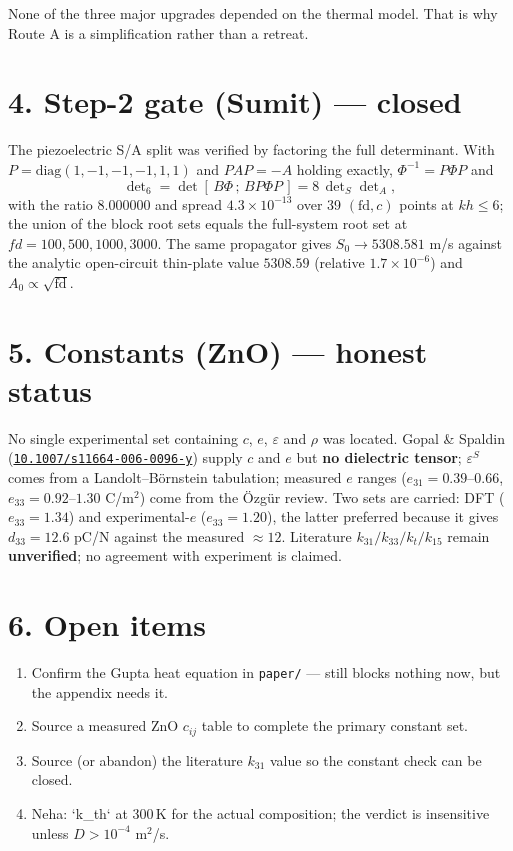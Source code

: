 \documentclass[11pt]{article}
\newcommand{\doi}[1]{\href{https://doi.org/#1}{\texttt{#1}}}
\begin{document}
\noindent None of the three major upgrades depended on the thermal model. That is why Route A is a
simplification rather than a retreat.

\section*{4. Step-2 gate (Sumit) --- closed}

The piezoelectric S/A split was verified by factoring the full determinant. With
$P=\mathrm{diag}(1,-1,-1,-1,1,1)$ and $PAP=-A$ holding exactly, $\Phi^{-1}=P\Phi P$ and
\[
\det\nolimits_{6}=\det[\,B\Phi\,;\,B P\Phi P\,]=8\,\det\nolimits_{S}\det\nolimits_{A},
\]
with the ratio $8.000000$ and spread $4.3\times10^{-13}$ over 39 $(\mathrm{fd},c)$ points at $kh\le6$;
the union of the block root sets equals the full-system root set at $fd=100,500,1000,3000$. The same
propagator gives $S_0\to5308.581$ m/s against the analytic open-circuit thin-plate value $5308.59$
(relative $1.7\times10^{-6}$) and $A_0\propto\sqrt{\mathrm{fd}}$.

\section*{5. Constants (ZnO) --- honest status}

No single experimental set containing $c$, $e$, $\varepsilon$ and $\rho$ was located. Gopal \& Spaldin
(\doi{10.1007/s11664-006-0096-y}) supply $c$ and $e$ but \textbf{no dielectric tensor}; $\varepsilon^S$
comes from a Landolt--B\"ornstein tabulation; measured $e$ ranges ($e_{31}=0.39$--$0.66$,
$e_{33}=0.92$--$1.30$ C/m$^2$) come from the \"Ozg\"ur review. Two sets are carried: DFT ($e_{33}=1.34$)
and experimental-$e$ ($e_{33}=1.20$), the latter preferred because it gives $d_{33}=12.6$ pC/N against
the measured $\approx12$. Literature $k_{31}/k_{33}/k_t/k_{15}$ remain \textbf{unverified}; no
agreement with experiment is claimed.

\section*{6. Open items}

\begin{enumerate}\small
\item Confirm the Gupta heat equation in \texttt{paper/} --- still blocks nothing now, but the appendix
needs it.
\item Source a measured ZnO $c_{ij}$ table to complete the primary constant set.
\item Source (or abandon) the literature $k_{31}$ value so the constant check can be closed.
\item Neha: `k_th` at 300\,K for the actual composition; the verdict is insensitive unless $D>10^{-4}$ m$^2$/s.
\end{enumerate}
\end{document}
